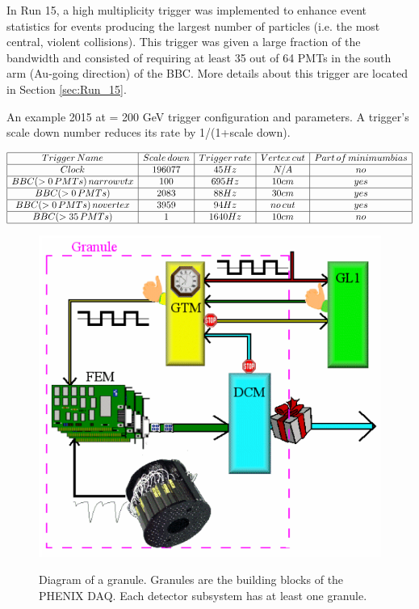 In Run 15, a high multiplicity trigger was implemented to enhance event statistics for events producing the largest number of particles (i.e. the most central, violent collisions). This trigger was given a large fraction of the bandwidth and consisted of requiring at least 35 out of 64 PMTs in the south arm (Au-going direction) of the BBC. More details about this trigger are located in Section \ref{sec:Run_15}.
\begin{table}[h!]
\centering
\caption{An example 2015 \pau at \sqsn = 200 GeV trigger configuration and parameters. A trigger's scale down number reduces its rate by 1/(1+scale down). }%
    $\begin{array}{|c|c|c|c|c|}
    \hline 
    Trigger\thinspace Name & Scale\thinspace down & Trigger\thinspace rate & Vertex\thinspace cut & Part\thinspace of\thinspace minimum bias \\ \hline
     Clock & 196077 & 45 Hz  & N/A & no \\ \hline
    BBC(>0\thinspace PMTs)\thinspace narrowvtx& 100 &  695 Hz &  10 cm & yes\\ \hline
    BBC(>0\thinspace PMTs)  & 2083 & 88 Hz &  30 cm & yes\\ \hline
    BBC(>0\thinspace PMTs)\thinspace novertex& 3959 &94 Hz  &no\thinspace cut & yes\\ \hline
    BBC(>35\thinspace  PMTs) & 1 & 1640 Hz &  10 cm & no \\ \hline
    \end{array}$
\label{tbl:trigger_config}
\end{table}

\begin{figure}[h!]
\begin{center}
\label{fig:granule_diag}
\includegraphics[width=0.55\linewidth]{figs/granule_diagram.png}
\caption{Diagram of a granule. Granules are the building blocks of the PHENIX DAQ. Each detector subsystem has at least one granule.} %
\end{center}
\end{figure}

